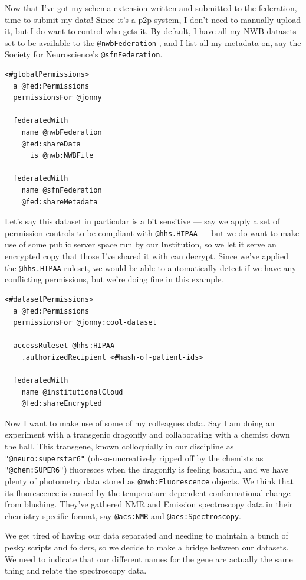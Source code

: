 \documentclass[notoc]{tufte-book}
\begin{document}
Now that I've got my schema extension written and submitted to the
federation, time to submit my data! Since it's a p2p system, I don't
need to manually upload it, but I do want to control who gets it. By
default, I have all my NWB datasets set to be available to the
\texttt{@nwbFederation} , and I list all my metadata on, say the Society
for Neuroscience's \texttt{@sfnFederation}.

\begin{verbatim}
<#globalPermissions>
  a @fed:Permissions
  permissionsFor @jonny

  federatedWith 
    name @nwbFederation
    @fed:shareData 
      is @nwb:NWBFile

  federatedWith
    name @sfnFederation
    @fed:shareMetadata
\end{verbatim}

Let's say this dataset in particular is a bit sensitive --- say we apply
a set of permission controls to be compliant with \texttt{@hhs.HIPAA}
--- but we do want to make use of some public server space run by our
Institution, so we let it serve an encrypted copy that those I've shared
it with can decrypt. Since we've applied the \texttt{@hhs.HIPAA}
ruleset, we would be able to automatically detect if we have any
conflicting permissions, but we're doing fine in this example.

\begin{verbatim}
<#datasetPermissions>
  a @fed:Permissions
  permissionsFor @jonny:cool-dataset

  accessRuleset @hhs:HIPAA
    .authorizedRecipient <#hash-of-patient-ids>
  
  federatedWith
    name @institutionalCloud
    @fed:shareEncrypted
\end{verbatim}

Now I want to make use of some of my colleagues data. Say I am doing an
experiment with a transgenic dragonfly and collaborating with a chemist
down the hall. This transgene, known colloquially in our discipline as
\texttt{"@neuro:superstar6"} (oh-so-uncreatively ripped off by the
chemists as \texttt{"@chem:SUPER6"}) fluoresces when the dragonfly is
feeling bashful, and we have plenty of photometry data stored as
\texttt{@nwb:Fluorescence} objects. We think that its fluorescence is
caused by the temperature-dependent conformational change from blushing.
They've gathered NMR and Emission spectroscopy data in their
chemistry-specific format, say \texttt{@acs:NMR} and
\texttt{@acs:Spectroscopy}.

We get tired of having our data separated and needing to maintain a
bunch of pesky scripts and folders, so we decide to make a bridge
between our datasets. We need to indicate that our different names for
the gene are actually the same thing and relate the spectroscopy data.
\end{document}
